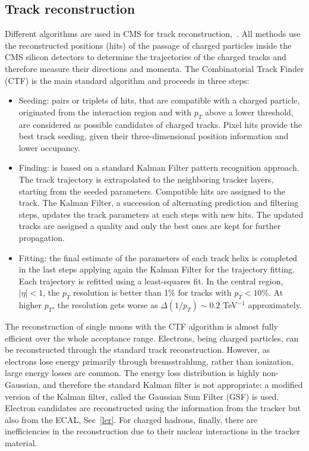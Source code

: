 \subsection*{Track reconstruction}
Different algorithms are used in CMS for track reconstruction,~\cite{Chatrchyan:2014fea, Adam:2005cg}.
All   methods   use   the   reconstructed positions (hits) of the passage of charged
particles inside the CMS silicon detectors to determine the
trajectories of the charged tracks and therefore measure their directions and momenta.  
The Combinatorial Track Finder (CTF) is the main standard algorithm and proceeds in three steps:
\begin{itemize} 
\item Seeding:  pairs or triplets of hits, that are compatible with a charged particle, originated from the interaction region and with $p_T$ above a lower
threshold, are considered as possible candidates of
charged tracks.  Pixel hits provide the best track
seeding, given their three-dimensional position information and lower occupancy.  
\item Finding: is based on a standard Kalman  Filter  pattern  recognition  approach.
The  track trajectory  is  extrapolated  to  the  neighboring tracker  layers, starting from the seeded parameters.
Compatible  hits  are  assigned to the track. 
The Kalman Filter, a  succession of  alternating  prediction  and  filtering  steps, 
updates the track parameters at each steps with new hits.
 The updated tracks are assigned a quality and only the best ones are kept for further propagation. 
\item Fitting: the  final  estimate  of  the   parameters  of
each  track  helix  is  completed  in  the  last  steps
applying again the Kalman Filter for the trajectory fitting.  Each trajectory is refitted using a
least-squares fit. In the central region, $|\eta|<1$, the $p_T$ resolution is better than 1\%  for tracks with $p_T<10\%$. 
At higher $p_T$, the resolution gets worse  as $\Delta (1/p_T) \sim 0.2$ TeV$^{-1}$  approximately.
\end{itemize}
The  reconstruction  of  single  muons  with  the
CTF  algorithm  is  almost  fully  efficient  over  the whole acceptance range.
Electrons, being charged particles, can be reconstructed through the standard track reconstruction.  However,  as electrons lose energy primarily through bremsstrahlung,  rather than ionization,  large energy losses are common.  
The energy loss distribution is highly non-Gaussian, and therefore the standard Kalman filter is not appropriate:
a modified version of the Kalman filter, called the Gaussian Sum Filter (GSF) is used. 
Electron candidates are reconstructed using the  information from the tracker but also from
the ECAL, Sec~\ref{ler}. 
For charged hadrons, finally, there are inefficiencies in the reconstruction due to their nuclear
interactions  in  the  tracker  material. 


